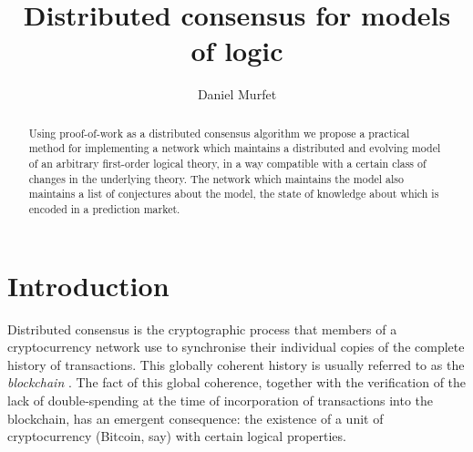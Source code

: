 \documentclass[english,letter paper,12pt,reqno]{article}
\theoremstyle{example}
\def\res{\operatorname{Res}}
\begin{document}
\def\ScoreOverhang{1pt}

\def\Res{\res\!}
\newcommand{\ud}[1]{\operatorname{d}\!{#1}}
\newcommand{\Ress}[1]{\res_{#1}\!}
\newcommand{\cat}[1]{\mathcal{#1}}
\newcommand{\lto}{\longrightarrow}
\newcommand{\xlto}[1]{\stackrel{#1}\lto}
\newcommand{\mf}[1]{\mathfrak{#1}}
\newcommand{\md}[1]{\mathscr{#1}}
\newcommand{\church}[1]{\underline{#1}}
\newcommand{\prf}[1]{\underline{#1}}
\newcommand{\den}[1]{\llbracket #1 \rrbracket}
\def\l{\,|\,}
\def\sgn{\textup{sgn}}
\def\cont{\operatorname{cont}}

\title{Distributed consensus for models of logic}
\author{Daniel Murfet}

\maketitle

\begin{abstract} Using proof-of-work as a distributed consensus algorithm we propose a practical method for implementing a network which maintains a distributed and evolving model of an arbitrary first-order logical theory, in a way compatible with a certain class of changes in the underlying theory. The network which maintains the model also maintains a list of conjectures about the model, the state of knowledge about which is encoded in a prediction market.
\end{abstract}



\section{Introduction}

Distributed consensus is the cryptographic process that members of a cryptocurrency network use to synchronise their individual copies of the complete history of transactions. This globally coherent history is usually referred to as the \emph{blockchain} \cite{satoshi}. The fact of this global coherence, together with the verification of the lack of double-spending at the time of incorporation of transactions into the blockchain, has an emergent consequence: the existence of a unit of cryptocurrency (Bitcoin, say) with certain logical properties.
\end{document}
